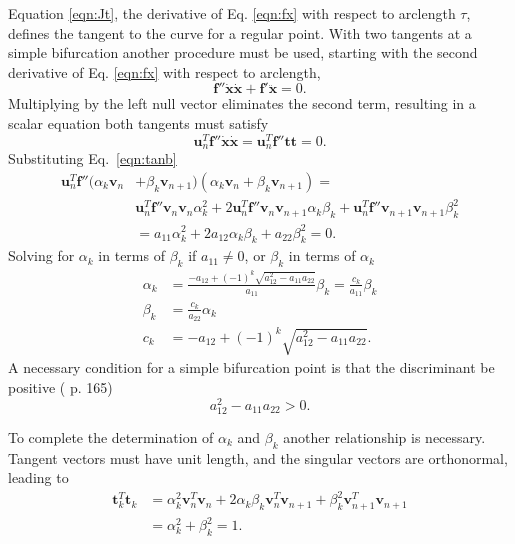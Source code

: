 \documentclass[10pt,openany,twoside]{book}
\numberwithin{equation}{section}   %
\newcommand{\Vector}[1]{\boldsymbol{#1}}
\newcommand{\Eqn}[1]{Eq.\ \ref{#1}}
\begin{document}
\par
Equation \ref{eqn:Jt}, the derivative of Eq. \ref{eqn:fx} with respect
to arclength $\tau$,
defines the tangent to the curve for a regular
point.
With two tangents at a simple bifurcation another procedure must
be used, starting with the
second derivative of Eq. \ref{eqn:fx}
with respect to arclength,
\begin{equation}
\Vector{f}''\dot{\Vector{x}}\dot{\Vector{x}} + \Vector{f}'\ddot{\Vector{x}} = 0.
\end{equation}
Multiplying
by the left null vector eliminates the second term,
resulting in a scalar equation both tangents must satisfy
\begin{equation}
\Vector{u}_n^T\Vector{f}''\dot{\Vector{x}}\dot{\Vector{x}} =
	\Vector{u}_n^T\Vector{f}''\Vector{t}\Vector{t} = 0.
\end{equation}
Substituting \Eqn{eqn:tanb}
\begin{align}
\Vector{u}_n^T\Vector{f}'' (\alpha_k\Vector{v}_n &+ \beta_k\Vector{v}_{n+1}) (\alpha_k\Vector{v}_n + \beta_k\Vector{v}_{n+1}) = \nonumber \\
 &     \Vector{u}_n^T\Vector{f}''\Vector{v}_n\Vector{v}_n \alpha_k^2 + 2\Vector{u}_n^T\Vector{f}''\Vector{v}_n\Vector{v}_{n+1}\alpha_k\beta_k + \Vector{u}_n^T\Vector{f}''\Vector{v}_{n+1}\Vector{v}_{n+1}\beta_k^2 \nonumber \\
    &= a_{11} \alpha_k^2 + 2a_{12}\alpha_k\beta_k + a_{22}\beta_k^2 = 0.
\end{align}
Solving for $\alpha_k$ in terms of $\beta_k$ if $a_{11} \ne 0$,
or $\beta_k$ in terms of $\alpha_k$
\begin{align}
\label{eqn:alpha}
 \alpha_k &= \frac{-a_{12} + (-1)^k\sqrt{a_{12}^2 - a_{11} a_{22}}}{a_{11}} \beta_k
 = \frac{c_k}{a_{11}} \beta_k  \nonumber \\
 \beta_k &= \frac{c_k}{a_{22}} \alpha_k \nonumber \\
 c_k &= -a_{12} + (-1)^k \sqrt{a_{12}^2 - a_{11} a_{22}}.
\end{align}
A necessary condition for a simple bifurcation point
is that the discriminant be positive (\cite{seydel1988equilibrium} p. 165)
\begin{equation*}
	a_{12}^2 - a_{11}a_{22} > 0.
\end{equation*}
\par
To complete the determination of $\alpha_k$ and $\beta_k$ another relationship is
necessary.
Tangent vectors must have unit length, and the singular vectors are
orthonormal, leading to
\begin{align*}
\Vector{t}_k^T\Vector{t}_k &= \alpha_k^2\Vector{v}_n^T\Vector{v}_n
	+ 2\alpha_k\beta_k\Vector{v}_n^T\Vector{v}_{n+1}
	+ \beta_k^2\Vector{v}_{n+1}^T\Vector{v}_{n+1} \nonumber \\
  &= \alpha_k^2 + \beta_k^2 = 1.
\end{align*}
\end{document}
